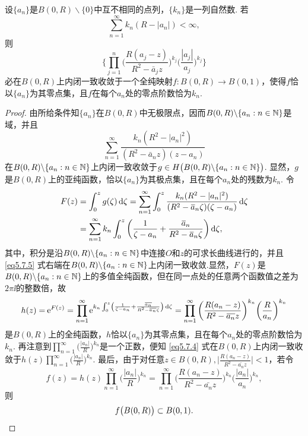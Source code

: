 \begin{theorem}\label{thm5.7.4}
  设$\{a_n\}$是$B(0,R)\backslash\{0\}$中互不相同的点列，$\{k_n\}$是一列自然数. 若
  \[
    \sum_{n=1}^\infty k_n(R-|a_n|) < \infty,
  \]
  则
  \begin{equation}\label{eq5.7.4}
    \bigg\{\prod_{j=1}^n\bigg(\frac{R(a_j-z)}{R^2-\bar a_jz}\bigg)^{k_j}
    \bigg(\frac{|a_j|}{a_j}\bigg)^{k_j}\bigg\}
  \end{equation}
  必在$B(0,R)$上内闭一致收敛于一个全纯映射$f:B(0,R)\to B(0,1)$，使得$f$恰以$\{a_n\}$为其零点集，且$f$在每个$a_n$处的零点阶数恰为$k_n$.
\end{theorem}
\begin{proof}
  由所给条件知$\{a_n\}$在$B(0,R)$中无极限点，因而$B(0,R)\backslash\{a_n:n\in\mathbb N\}$是域，并且
  \[
    \sum_{n=1}^\infty\frac{k_n(R^2-|a_n|^2)}{(R^2-\bar a_nz)(z-a_n)}
  \]
  在$B(0,R)\backslash\{a_n:n\in\mathbb N\}$上内闭一致收敛于$g\in H\big(B(0,R)\backslash
  \{a_n:n\in\mathbb N\}\big)$. 显然，$g$是$B(0,R)$上的亚纯函数，恰以$\{a_n\}$为其极点集，且在每个$a_n$处的残数为$k_n$. 令
  \begin{equation}\label{eq5.7.5}
    \begin{aligned}
      F(z) & = \int_0^zg(\zeta)\mathop{}\!\mathrm{d} \zeta=\sum_{n=1}^\infty\int_0^z
             \frac{k_n(R^2-|a_n|^2)}{(R^2-{}\mkern1mu\overline{\mkern-1mua}_n\zeta)(\zeta-a_n)}\mathop{}\!\mathrm{d} \zeta\\
           & = \sum_{n=1}^\infty k_n\int_0^z\bigg(\frac1{\zeta-a_n}+\frac{{}\mkern1mu\overline{\mkern-1mua}_n}{R^2
             - {}\mkern1mu\overline{\mkern-1mua}_n\zeta}\bigg)\mathop{}\!\mathrm{d} \zeta,
    \end{aligned}
  \end{equation}
  其中，积分是沿$B(0,R)\backslash\{a_n:n\in\mathbb N\}$中连接$O$和$z$的可求长曲线进行的，并且 \eqref{eq5.7.5} 式右端在$B(0,R)\backslash\{a_n:n\in\mathbb N\}$上内闭一致收敛.显然，$F(z)$是$B(0,R)\backslash\{a_n:n\in\mathbb N\}$上的多值全纯函数，但在同一点处的任意两个函数值之差为$2\pi\ii$的整数倍，故
  \[
    h(z) = \operatorname{\!\!\;\mathrm e}^{F(z)} = \prod_{n=1}^\infty\operatorname{\!\!\;\mathrm e}^{k_n\int_0^z\left(\frac1{\zeta-a_n}
    + \frac{{}\mkern1mu\overline{\mkern-1mua_n}}{R^2-{}\mkern1mu\overline{\mkern-1mua_n}\zeta}\right)\mathop{}\!\mathrm{d} \zeta}
    = \prod_{n=1}^\infty\bigg(\frac{R(a_n-z)}{R^2-{}\mkern1mu\overline{\mkern-1mua_n}z}\bigg)^{k_n}
    \bigg(\frac{R}{a_n}\bigg)^{k_n}
  \]
  是$B(0,R)$上的全纯函数，$h$恰以$\{a_n\}$为其零点集，且在每个$a_n$处的零点阶数恰为$k_n$. 再注意到$\prod_{n=1}^\infty\bigg(\frac{|a_n|}{R}\bigg)^{k_n}$是一个正数，便知 \eqref{eq5.7.4} 式在$B(0,R)$上内闭一致收敛于$h(z)\prod_{n=1}^\infty\bigg(\frac{|a_n|}{R}\bigg)^{k_n}$. 最后，由于对任意$z\in B(0,R),\bigg|\frac{R(a_n-z)}{R^2-\bar {a_n}z}\bigg|<1$，若令
  \[
    f(z) = h(z)\prod_{n=1}^\infty\bigg(\frac{|a_n|}{R}\bigg)^{k_n}
    = \prod_{n=1}^\infty\bigg(\frac{R(a_n-z)}{R^2-\bar {a_n}z}\bigg)^{k_n}
    \bigg(\frac{|a_n|}{a_n}\bigg)^{k_n},
  \]
  则
  \begin{equation*}
    f\big(B(0,R)\big)\subset B(0,1). \qedhere
  \end{equation*}
\end{proof}


